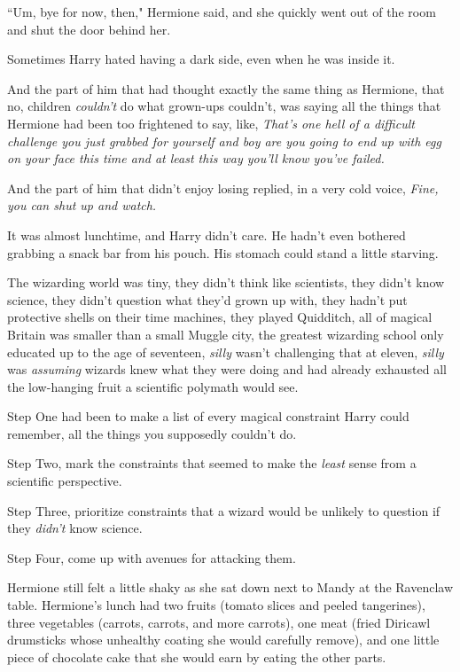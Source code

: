 ``Um, bye for now, then," Hermione said, and she quickly went out of the room and shut the door behind her.

Sometimes Harry hated having a dark side, even when he was inside it.

And the part of him that had thought exactly the same thing as Hermione, that no, children \emph{couldn't} do what grown-ups couldn't, was saying all the things that Hermione had been too frightened to say, like, \emph{That's one hell of a difficult challenge you just grabbed for yourself \emph{and} boy are you going to end up with egg on your face this time \emph{and} at least this way you'll know you've failed.}

And the part of him that didn't enjoy losing replied, in a very cold voice, \emph{Fine, you can shut up and watch.}

\later

It was almost lunchtime, and Harry didn't care. He hadn't even bothered grabbing a snack bar from his pouch. His stomach could stand a little starving.

The wizarding world was tiny, they didn't think like scientists, they didn't know science, they didn't question what they'd grown up with, they hadn't put protective shells on their time machines, they played Quidditch, all of magical Britain was smaller than a small Muggle city, the greatest wizarding school only educated up to the age of seventeen, \emph{silly} wasn't challenging that at eleven, \emph{silly} was \emph{assuming} wizards knew what they were doing and had already exhausted all the low-hanging fruit a scientific polymath would see.

Step One had been to make a list of every magical constraint Harry could remember, all the things you supposedly couldn't do.

Step Two, mark the constraints that seemed to make the \emph{least} sense from a scientific perspective.

Step Three, prioritize constraints that a wizard would be unlikely to question if they \emph{didn't} know science.

Step Four, come up with avenues for attacking them.

\later

Hermione still felt a little shaky as she sat down next to Mandy at the Ravenclaw table. Hermione's lunch had two fruits (tomato slices and peeled tangerines), three vegetables (carrots, carrots, and more carrots), one meat (fried Diricawl drumsticks whose unhealthy coating she would carefully remove), and one little piece of chocolate cake that she would earn by eating the other parts.

